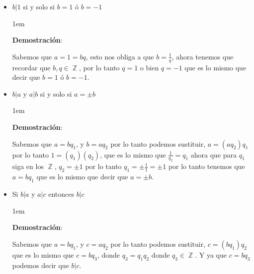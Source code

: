 \documentclass[12pt]{report}                                    %
\newenvironment{SmallIndentation}[1][0.75em]                    %
    {\begin{adjustwidth}{#1}{}\begin{footnotesize}}                 %
    {\end{footnotesize}\end{adjustwidth}}                           %
\DeclareMathOperator \Integers  {\mathbb{Z}}                     %
\begin{document}
\begin{itemize}
                \item $b|1$ si y solo si $b=1$ ó $b=-1$

                    \begin{SmallIndentation}[1em]
                        \textbf{Demostración}:

                        Sabemos que $a=1=bq$, esto nos obliga a que $b=\frac{1}{q}$, ahora tenemos que
                        recordar que $b, q \in \Integers$, por lo tanto $q=1$ o bien $q=-1$ que es lo
                        mismo que decir que $b=1$ ó $b=-1$. 

                    \end{SmallIndentation}


                \item $b|a$ y $a|b$ si y solo si $a=\pm b$

                    \begin{SmallIndentation}[1em]
                        \textbf{Demostración}:

                        Sabemos que $a=bq_1$, y $b=aq_2$ por lo tanto podemos sustituir, 
                        $a=(aq_2)q_1$ por lo tanto $1=(q_1)(q_2)$, que es lo mismo que
                        $\frac{1}{q_2}=q_1$ ahora que para $q_1$ siga en los $\Integers$,
                        $q_2 = \pm 1$ por lo tanto $q_1 = \pm \frac{1}{1} = \pm 1$ por
                        lo tanto tenemos que $a = bq_1$ que es lo mismo que decir que $a = \pm b$.

                    \end{SmallIndentation}


                \item Si $b|a$ y $a|c$ entonces $b|c$

                    \begin{SmallIndentation}[1em]
                        \textbf{Demostración}:

                        Sabemos que $a=bq_1$, y $c=aq_2$ por lo tanto podemos sustituir, 
                        $c=(bq_1)q_2$ que es lo mismo que $c=bq_3$, donde $q_3 = q_1q_2$
                        donde $q_3 \in \Integers$. 
                        Y ya que $c=bq_3$ podemos decir que $b|c$.

                    \end{SmallIndentation}


\end{itemize}
\end{document}
